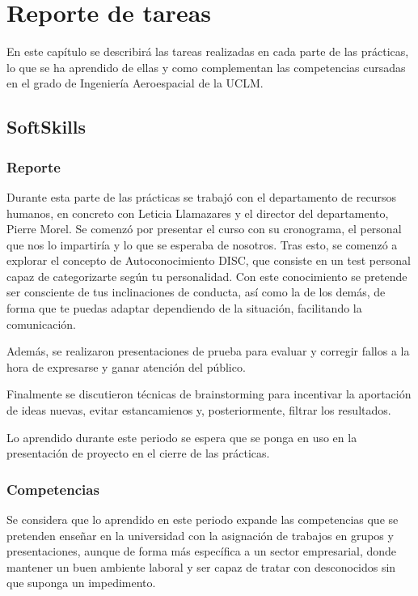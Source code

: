 \newcommand{\ReportSection}[4]{%
    \section{#1}  %
    \label{sec:#1}
    #2
    \subsection{Reporte}
    \label{subsec:report#1}
    #3
    \subsection{Competencias}
    \label{subsec:competences#1}
    #4
}
\chapter{Reporte de tareas}
\label{ch:taskReport}

En este capítulo se describirá las tareas realizadas en cada parte de las prácticas, lo que se ha aprendido de ellas y como complementan las competencias cursadas en el grado de Ingeniería Aeroespacial de la UCLM.


\ReportSection
{SoftSkills}{}
{
    Durante esta parte de las prácticas se trabajó con el departamento de recursos humanos, en concreto con Leticia Llamazares y el director del departamento, Pierre Morel.
    Se comenzó por presentar el curso con su cronograma, el personal que nos lo impartiría y lo que se esperaba de nosotros.
    Tras esto, se comenzó a explorar el concepto de Autoconocimiento DISC, que consiste en un test personal capaz de categorizarte según tu personalidad. Con este conocimiento se pretende ser consciente de tus inclinaciones de conducta, así como la de los demás, de forma que te puedas adaptar dependiendo de la situación, facilitando la comunicación.
    
    Además, se realizaron presentaciones de prueba para evaluar y corregir fallos a la hora de expresarse y ganar atención del público.
    
    Finalmente se discutieron técnicas de brainstorming para incentivar la aportación de ideas nuevas, evitar estancamienos y, posteriormente, filtrar los resultados.
    
    Lo aprendido durante este periodo se espera que se ponga en uso en la presentación de proyecto en el cierre de las prácticas.
    
}
{
    Se considera que lo aprendido en este periodo expande las competencias que se pretenden enseñar en la universidad con la asignación de trabajos en grupos y presentaciones, aunque de forma más específica a un sector empresarial, donde mantener un buen ambiente laboral y ser capaz de tratar con desconocidos sin que suponga un impedimento.
}

